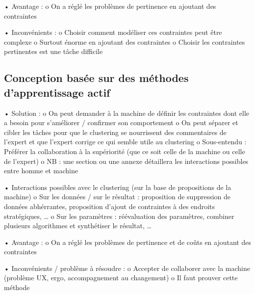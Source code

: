             •	Avantage :
                o	On a réglé les problèmes de pertinence en ajoutant des contraintes

            •	Inconvénients : 
                o	Choisir comment modéliser ces contraintes peut être complexe
                o	Surtout énorme en ajoutant des contraintes
                o	Choisir les contraintes pertinentes est une tâche difficile

        \subsection{Conception basée sur des méthodes d’apprentissage actif}

            •	Solution :
                o	On peut demander à la machine de définir les contraintes dont elle a besoin pour s’améliorer / confirmer son comportement
                o	On peut séparer et cibler les tâches pour que le clustering se nourrissent des commentaires de l’expert et que l’expert corrige ce qui semble utile au clustering
                o	Sous-entendu : Préférer la collaboration à la supériorité (que ce soit celle de la machine ou celle de l’expert)
                o	NB : une section ou une annexe détaillera les interactions possibles entre homme et machine

            •   Interactions possibles avec le clustering (sur la base de propositions de la machine)
                o	Sur les données / sur le résultat : proposition de suppression de données abhérrantes, proposition d'ajout de contraintes à des endroits stratégiques, …
                o	Sur les paramètres : réévaluation des paramètres, combiner plusieurs algorithmes et synthétiser le résultat, …

            •	Avantage :
                o	On a réglé les problèmes de pertinence et de coûts en ajoutant des contraintes

            •	Inconvénients / problème à résoudre : 
                o	Accepter de collaborer avec la machine (problème UX, ergo, accompagnement au changement)
                o	Il faut prouver cette méthode